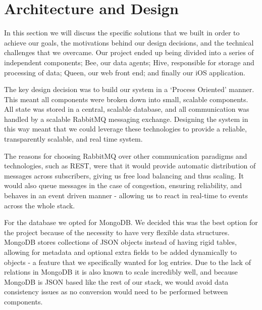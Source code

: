 \section{Architecture and Design}

In this section we will discuss the specific solutions that we built in order
to achieve our goals, the motivations behind our design decisions, and the
technical challenges that we overcame. Our project ended up being divided into
a series of independent components; Bee, our data agents; Hive, responsible for
storage and processing of data; Queen, our web front end; and finally our iOS
application.

The key design decision was to build our system in a ‘Process Oriented’ manner.
This meant all components were broken down into small, scalable components. All
state was stored in a central, scalable database, and all communication was
handled by a scalable RabbitMQ messaging exchange. Designing the system in this
way meant that we could leverage these technologies to provide a reliable,
transparently scalable, and real time system.

The reasons for choosing RabbitMQ over other communication paradigms and
technologies, such as REST, were that it would provide automatic distribution
of messages across subscribers, giving us free load balancing and thus scaling.
It would also queue messages in the case of congestion, ensuring reliability,
and behaves in an event driven manner - allowing us to react in real-time to
events across the whole stack.

For the database we opted for MongoDB. We decided this was the best option for
the project because of the necessity to have very flexible data structures.
MongoDB stores collections of JSON objects instead of having rigid tables,
allowing for metadata and optional extra fields to be added dynamically to
objects - a feature that we specifically wanted for log entries. Due to the
lack of relations in MongoDB it is also known to scale incredibly well, and
because MongoDB is JSON based like the rest of our stack, we would avoid data
consistency issues as no conversion would need to be performed between
components.
